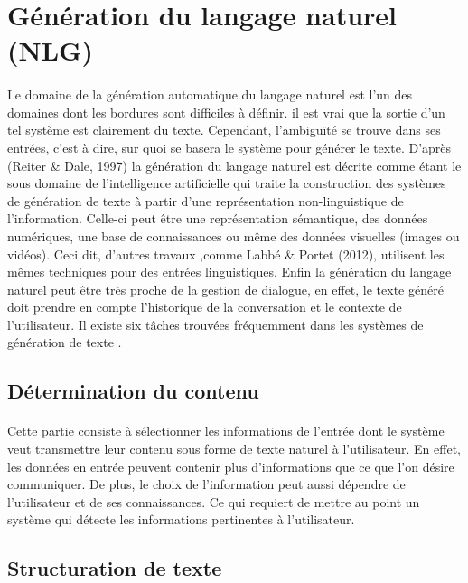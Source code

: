 \section{Génération du langage naturel (NLG)}\label{NLG}
	\paragraph{}
	Le domaine de la génération automatique du langage naturel est l’un des domaines dont les bordures sont difficiles à définir\cite{evans2002}. il est vrai que la sortie d’un tel système est clairement du texte. Cependant, l’ambiguïté se trouve dans ses entrées, c’est à dire, sur quoi se basera le système pour générer le texte. D’après (Reiter \& Dale, 1997)\cite{Reiter:1997} la génération du langage naturel est décrite comme étant le sous domaine de l’intelligence artificielle qui traite la construction des systèmes de génération de texte à partir d’une représentation non-linguistique de l’information. Celle-ci peut être une représentation sémantique, des données numériques, une base de connaissances ou même des données visuelles (images ou vidéos). Ceci dit, d’autres travaux ,comme Labbé \& Portet (2012)\cite{Labbé2012}, utilisent les mêmes techniques pour des entrées linguistiques. Enfin la génération du langage naturel peut être très proche de la gestion de dialogue\cite{Dethlefs2014}, en effet, le texte généré doit prendre en compte l’historique de la conversation et le contexte de l’utilisateur.\newline
	Il existe six tâches trouvées fréquemment dans les systèmes de génération de texte \cite{Reiter:1997}.
	
	\subsection{Détermination du contenu}
	\paragraph{}
	Cette partie consiste à sélectionner les informations de l’entrée dont le système veut transmettre leur contenu sous forme de texte naturel à l’utilisateur. En effet, les données en entrée peuvent contenir plus d’informations que ce que l’on désire communiquer\cite{Yu:2007}. De plus, le choix de l'information peut aussi dépendre de l’utilisateur et de ses connaissances\cite{Dethlefs2014}. Ce qui requiert de mettre au point un système qui détecte les informations pertinentes à l’utilisateur.
	\subsection{Structuration de texte}
